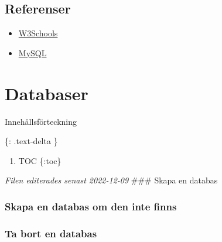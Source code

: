 \hypertarget{referenser-1}{%
\subsection{Referenser}\label{referenser-1}}

\begin{itemize}
\tightlist
\item
  \href{https://www.w3schools.com/sql/sql_foreignkey.asp}{W3Schools}
\item
  \href{https://dev.mysql.com/doc/refman/8.0/en/create-table-foreign-keys.html}{MySQL}
\end{itemize}

\hypertarget{databaser}{%
\section{Databaser}\label{databaser}}

Innehållsförteckning

\{: .text-delta \}

\begin{enumerate}
\def\labelenumi{\arabic{enumi}.}
\tightlist
\item
  TOC \{:toc\}
\end{enumerate}

\emph{Filen editerades senast 2022-12-09} \#\#\# Skapa en databas

\hypertarget{cb1}{}
\begin{Shaded}
\begin{Highlighting}[]
 
\end{Highlighting}
\end{Shaded}

\hypertarget{skapa-en-databas-om-den-inte-finns}{%
\subsubsection{Skapa en databas om den inte
finns}\label{skapa-en-databas-om-den-inte-finns}}

\hypertarget{cb2}{}
\begin{Shaded}
\begin{Highlighting}[]
    
\end{Highlighting}
\end{Shaded}

\hypertarget{ta-bort-en-databas}{%
\subsubsection{Ta bort en databas}\label{ta-bort-en-databas}}

